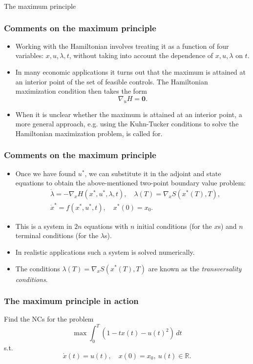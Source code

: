 \documentclass[10pt]{beamer}
\theoremstyle{definition}
\begin{document}
\begin{section}{The maximum principle}
\begin{frame}[fragile]
\frametitle{Comments on the maximum principle}
\begin{itemize}\itemsep1em
\item Working with the Hamiltonian involves treating it as a function of four variables: $ x,u,\lambda,t $, without taking into account the dependence of $ x,u,\lambda $ on $ t $.
\item In many economic applications it turns out that the maximum is attained at an interior point of the set of feasible controls. The Hamiltonian maximization condition then takes the form \[ \nabla_u H = \mathbf{0}. \]
\item When it is unclear whether the maximum is attained at an interior point, a more general approach, e.g. using the Kuhn-Tucker conditions to solve the Hamiltonian maximization problem, is called for.
\end{itemize}
\end{frame}

\begin{frame}[fragile]
\frametitle{Comments on the maximum principle}
\begin{itemize}\itemsep1em
\item Once we have found $ u^* $, we can substitute it in the adjoint and state equations to obtain the above-mentioned two-point boundary value problem:
\[ \begin{split}
&\dot{\lambda}  = - \nabla_x H(x^*,u^*,\lambda,t),\quad  \lambda(T)=\nabla_x S(x^*(T),T),\\
&\dot{x}^*  = f(x^*,u^*,t), \quad x^*(0)=x_0.
\end{split} \]
\item This is a system in $ 2n $ equations with $ n $ initial conditions (for the $ x $s)  and $ n $ terminal conditions (for the $ \lambda $s).
\item In realistic applications such a system is solved numerically.
\item The conditions $ \lambda(T)=\nabla_x S(x^*(T),T) $ are known as the \emph{transversality conditions}.
\end{itemize}
\end{frame}

\begin{frame}[fragile]
\frametitle{The maximum principle in action}
\begin{example}
Find the NCs for the problem
\[ \max \int_{0}^{T}(1-tx(t)-u(t)^2)\,dt \]
s.t. \[ \dot{x}(t)=u(t),\quad x(0)=x_0,~u(t)\in \mathbb{R}. \]\bigskip \pause


\end{example}
\end{frame}
\end{section}
\end{document}
